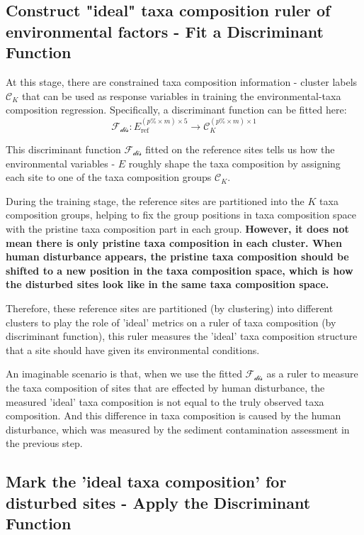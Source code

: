 \subsection{Construct "ideal" taxa composition ruler of environmental factors - Fit a Discriminant Function}

At this stage, there are constrained taxa composition information - cluster labels \(\mathcal{C}_K\) that can be used as
response variables in training the environmental-taxa composition regression. 
Specifically, a discriminant function can be fitted here:
\[
\mathcal{F_{\text{dis}}} : E_{\text{ref}}^{(p\% \times m) \times 5} \to \mathcal{C}_K^{(p\% \times m) \times 1}
\]

This discriminant function \(\mathcal{F_{\text{dis}}}\) fitted on the reference sites tells us how the environmental variables - \(E\) roughly shape the 
taxa composition by assigning each site to one of the taxa composition groups \(\mathcal{C}_K\).

During the training stage, the reference sites are partitioned into the \(K\) taxa composition groups, 
helping to fix the group positions in taxa composition space with the pristine taxa composition part in 
each group. \textbf{However, it does not mean there is only pristine taxa composition in each cluster.
When human disturbance appears, the pristine taxa composition should be shifted to a new position in the taxa composition space,
which is how the disturbed sites look like in the same taxa composition space.}

Therefore, these reference sites are partitioned (by clustering) into different clusters to play the role of 'ideal' metrics
on a ruler of taxa composition (by discriminant function), this ruler measures the 'ideal' taxa composition structure that a site should have given its environmental conditions.

An imaginable scenario is that, when we use the fitted \(\mathcal{F_{\text{dis}}}\) as a ruler to measure the taxa composition of sites that are effected by human disturbance,
the measured 'ideal' taxa composition is not equal to the truly observed taxa composition. 
And this difference in taxa composition is caused by the human disturbance, which was measured by the sediment contamination assessment in the previous step.

\subsection{Mark the 'ideal taxa composition' for disturbed sites - Apply the Discriminant Function}

